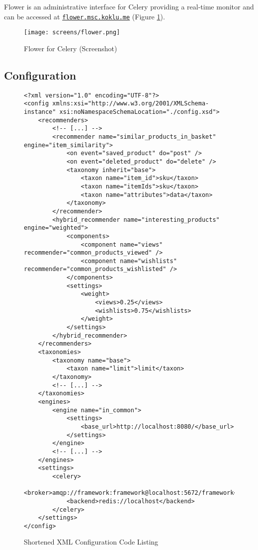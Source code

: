 Flower is an administrative interface for Celery providing a real-time monitor and can be accessed at \href{http://flower.msc.koklu.me}{\texttt{flower.msc.koklu.me}} (Figure \ref{fig:implementation-framework-flower}).

\begin{figure}[ht]
    \texttt{[image: screens/flower.png]}
    \caption{Flower for Celery (Screenshot)}
    \label{fig:implementation-framework-flower}
\end{figure}

\subsection{Configuration}

\begin{figure}[ht!]
    \begin{verbatim}
<?xml version="1.0" encoding="UTF-8"?>
<config xmlns:xsi="http://www.w3.org/2001/XMLSchema-instance" xsi:noNamespaceSchemaLocation="./config.xsd">
    <recommenders>
        <!-- [...] -->
        <recommender name="similar_products_in_basket" engine="item_similarity">
            <on event="saved_product" do="post" />
            <on event="deleted_product" do="delete" />
            <taxonomy inherit="base">
                <taxon name="item_id">sku</taxon>
                <taxon name="itemIds">sku</taxon>
                <taxon name="attributes">data</taxon>
            </taxonomy>
        </recommender>
        <hybrid_recommender name="interesting_products" engine="weighted">
            <components>
                <component name="views" recommender="common_products_viewed" />
                <component name="wishlists" recommender="common_products_wishlisted" />
            </components>
            <settings>
                <weight>
                    <views>0.25</views>
                    <wishlists>0.75</wishlists>
                </weight>
            </settings>
        </hybrid_recommender>
    </recommenders>
    <taxonomies>
        <taxonomy name="base">
            <taxon name="limit">limit</taxon>
        </taxonomy>
        <!-- [...] -->
    </taxonomies>
    <engines>
        <engine name="in_common">
            <settings>
                <base_url>http://localhost:8080/</base_url>
            </settings>
        </engine>
        <!-- [...] -->
    </engines>
    <settings>
        <celery>
            <broker>amqp://framework:framework@localhost:5672/framework</broker>
            <backend>redis://localhost</backend>
        </celery>
    </settings>
</config>
    \end{verbatim}
    \caption{Shortened XML Configuration Code Listing}
    \label{fig:implementation-framework-configuration}
\end{figure}

